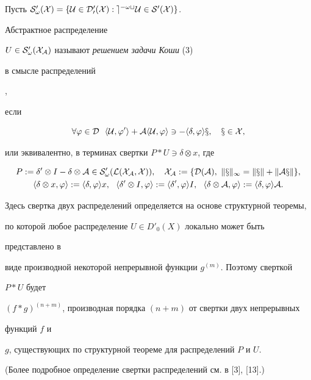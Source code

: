 \begin{defn} 


Пусть $\cal S'_\omega(X)=\{U\in\cal D'_0(X):e^{-\omega t} U\in\cal S'(X)\}$. 


Абстрактное распределение 


$U\in\cal S'_\omega(X_{\cal A})$ называют {\it решением задачи Коши} (3) {\it 


в смысле распределений}, 


если 


\begin{equation} 


\forall\varphi\in\cal D\ \ \la U,\varphi'\ra+\cal A\la U,\varphi\ra 


\ni-\la\delta,\varphi\ra x,\quad x\in X, 


\end{equation} 


или эквивалентно, в терминах свертки $P\ast U\ni\delta\otimes x$, где 


\begin{gather*} 


P:=\delta'\otimes I-\delta\otimes\cal A\in\cal S'_\omega 


(\cal L(X_{\cal A},X)),\quad X_{\cal A}:=\{D(\cal A),\ \|x\|_1= 


\|x\|+\|\cal A x\|\}, \\ 


% 


\la\delta\otimes x,\varphi\ra:=\la\delta,\varphi\ra x,\ \ 


\la\delta'\otimes I,\varphi\ra:=\la\delta',\varphi\ra I,\ \ 


\la\delta\otimes\cal A,\varphi\ra:=\la\delta,\varphi\ra\cal A. 


\end{gather*} 


Здесь свертка двух распределений определяется на основе структурной теоремы, 


по которой любое распределение $U\in D'_0(X)$ локально может быть 


представлено в 


виде производной некоторой непрерывной функции $g^{(m)}$. Поэтому сверткой 


$P\ast U$ будет 


$(f\ast g)^{(n+m)}$, производная порядка $(n+m)$ от свертки двух непрерывных 


функций $f$ и 


$g$, существующих по структурной теореме для распределений $P$ и $U$. 


(Более подробное определение свертки распределений см. в [3], [13].) 


\end{defn} 


